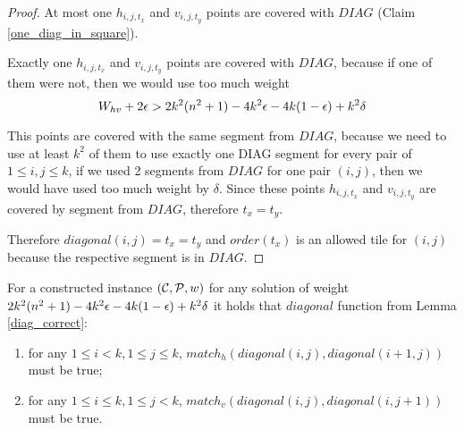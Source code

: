 \begin{proof}
At most one $h_{i,j,t_x}$ and $v_{i,j,t_y}$
points are covered with $DIAG$
(Claim \ref{one_diag_in_square}).
	
Exactly one $h_{i,j,t_x}$ and $v_{i,j,t_y}$
points are covered with $DIAG$,
because if one of them were not, then we would use too much weight
$$W_{hv} + 2\epsilon > 2k^2(n^2+1) - 4k^2\epsilon -4k(1-\epsilon) +k^2\delta$$

This points are covered with the same segment from $DIAG$,
because we need to use at least $k^2$ of them to use
exactly one DIAG segment for every pair of $1 \le i,j \le k$,
if we used 2 segments from $DIAG$
for one pair $(i,j)$,
then we would have used too much weight by $\delta$.
Since these points $h_{i,j,t_x}$ and $v_{i,j,t_y}$ are covered by
segment from $DIAG$, therefore $t_x = t_y$.

Therefore $diagonal(i,j) = t_x = t_y$
and $order(t_x)$ is an allowed tile for $(i,j)$
because the respective segment is in $DIAG$.

\end{proof}

\begin{lemma}
\label{vertical_horizontal_synchronized}
For a constructed instance $(\mathcal{C}, \mathcal{P}, w)$
for any solution of weight $2k^2(n^2+1) - 4k^2\epsilon -4k(1-\epsilon) +k^2\delta$ it holds that $diagonal$ function
from Lemma \ref{diag_correct}:
\begin{enumerate}
\item 
for any $1 \le i < k, 1 \le j \le k$,
$match_h(diagonal(i, j),diagonal(i+1, j))$ must be true;
\item 
for any $1 \le i \le k, 1 \le j < k$,
$match_v(diagonal(i, j),diagonal(i, j+1))$ must be true.
\end{enumerate}
\end{lemma}

